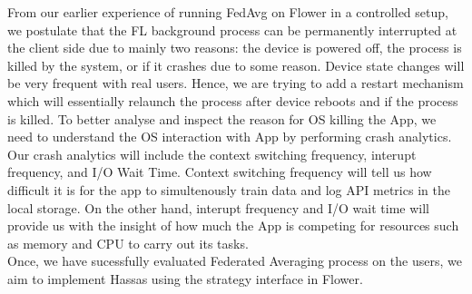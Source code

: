 From our earlier experience of running FedAvg on Flower in a controlled setup, we postulate that the FL background process can be permanently interrupted at the client side due to mainly two reasons: the device is powered off, the process is killed by the system, or if it crashes due to some reason. Device state changes will be very frequent with real users. Hence, we are trying to add a restart mechanism which will essentially relaunch the process after device reboots and if the process is killed. To better analyse and inspect the reason for OS killing the App, we need to understand the OS interaction with App by performing crash analytics. Our crash analytics will include the context switching frequency, interupt frequency, and I/O Wait Time. Context switching frequency will tell us how difficult it is for the app to simultenously train data and log API metrics in the local storage. On the other hand, interupt frequency and I/O wait time will provide us with the insight of how much the App is competing for resources such as memory and CPU to carry out its tasks. \\

Once, we have sucessfully evaluated Federated Averaging process on the users, we aim to implement Hassas using the strategy interface in Flower.
